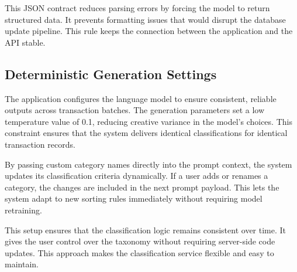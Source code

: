 This JSON contract reduces parsing errors by forcing the model to return structured data. It prevents formatting issues that would disrupt the database update pipeline. This rule keeps the connection between the application and the API stable.

\subsection{Deterministic Generation Settings}
The application configures the language model to ensure consistent, reliable outputs across transaction batches. The generation parameters set a low temperature value of 0.1, reducing creative variance in the model's choices. This constraint ensures that the system delivers identical classifications for identical transaction records.

By passing custom category names directly into the prompt context, the system updates its classification criteria dynamically. If a user adds or renames a category, the changes are included in the next prompt payload. This lets the system adapt to new sorting rules immediately without requiring model retraining.

This setup ensures that the classification logic remains consistent over time. It gives the user control over the taxonomy without requiring server-side code updates. This approach makes the classification service flexible and easy to maintain.
